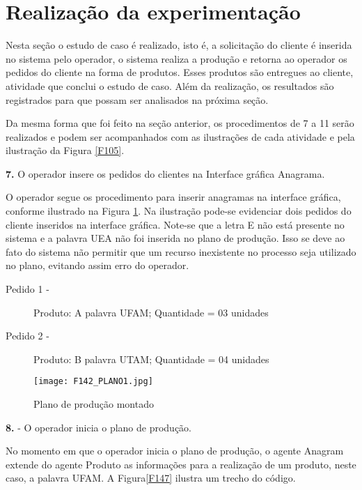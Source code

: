 	\newpage
	
		
\section{Realização da experimentação}


Nesta seção o estudo de caso é realizado, isto é, a solicitação do cliente é inserida no sistema pelo operador, o sistema realiza a produção e retorna ao operador os pedidos do cliente na forma de produtos. Esses produtos são entregues ao cliente, atividade que conclui o estudo de caso. Além da realização, os resultados são registrados para que possam ser analisados na próxima seção. \par 

Da mesma forma que foi feito na seção anterior, os procedimentos de 7 a 11 serão realizados e podem ser acompanhados com as ilustrações de cada atividade e pela ilustração da Figura \ref{F105}.
		
		\textbf{7.} O operador insere os pedidos do clientes na Interface gráfica Anagrama.

	O operador segue os procedimento para inserir anagramas na interface gráfica, conforme ilustrado na Figura \ref{F142}. Na ilustração pode-se evidenciar dois pedidos do cliente inseridos na interface gráfica. Note-se que a letra E não está presente no sistema e a palavra UEA não foi inserida no plano de produção. Isso se deve ao fato do sistema não permitir que um recurso inexistente no processo seja utilizado no plano, evitando assim erro do operador.
	\begin{description}
		\item[Pedido 1 -] Produto: A  palavra UFAM; Quantidade = 03 unidades
		\item[Pedido 2 -] Produto: B  palavra UTAM; Quantidade = 04 unidades
	\end{description} 
		
			\begin{figure}[!h]
				\centering
				\texttt{[image: F142\_PLANO1.jpg]} 
				\caption{Plano de produção montado}
				\label{F142}
			\end{figure}
		
		
			\textbf{8.} - O operador inicia o plano de produção.

No momento em que o operador inicia o plano de produção, o agente Anagram extende do agente Produto as informações para a realização de um produto, neste caso, a palavra UFAM. A Figura\ref{F147} ilustra um trecho do código. 

